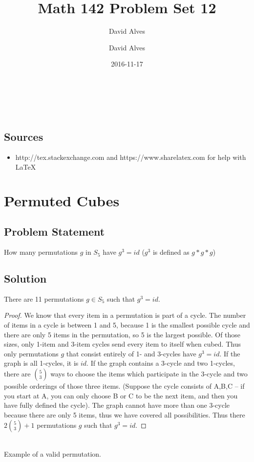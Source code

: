 \documentclass[12pt]{article}
\author{David Alves}
\title{Math 142 Problem Set 12}
\author{David Alves}
\date{2016-11-17}
\newcommand{\ProblemStatement}[1]{
\subsection*{Problem Statement}
#1
\subsection*{Solution}
}
\begin{document}

\begin{center}
\large \thetitle \\
\theauthor \\
\thedate
\end{center}

\subsection*{Sources}

    \begin{itemize}
    \item http://tex.stackexchange.com and https://www.sharelatex.com for help with \LaTeX
    \end{itemize}

\section{Permuted Cubes}
\ProblemStatement{
How many permutations $g$ in $S_5$ have $g^3 = id$ ($g^3$ is defined as $g*g*g$)
}

There are 11 permutations $g \in S_5$ such that $g^3 = id$.
\begin{proof}
We know that every item in a permutation is part of a cycle. The number of items in a cycle is between 1 and 5, because 1 is the smallest possible cycle and there are only 5 items in the permutation, so 5 is the largest possible. Of those sizes, only 1-item and 3-item cycles send every item to itself when cubed. Thus only permutations $g$ that consist entirely of 1- and 3-cycles have $g^3=id$. If the graph is all 1-cycles, it is $id$. If the graph contains a 3-cycle and two 1-cycles, there are $\binom{5}{3}$ ways to choose the items which participate in the 3-cycle and two possible orderings of those three items. (Suppose the cycle consists of A,B,C -- if you start at A, you can only choose B or C to be the next item, and then you have fully defined the cycle). The graph cannot have more than one 3-cycle because there are only 5 items, thus we have covered all possibilities. Thus there $2\binom{5}{3} + 1$ permutations $g$ such that $g^3=id$.
\end{proof}
\begin{center}
\\Example of a valid permutation.
\end{center}
\end{document}

